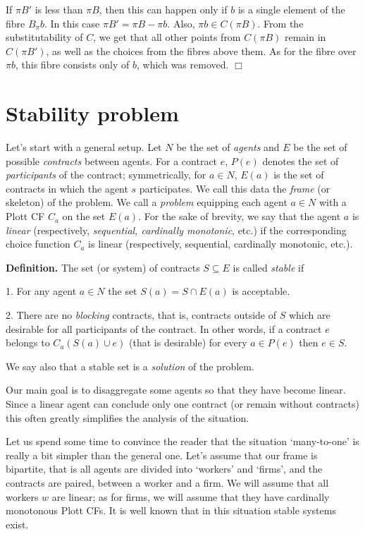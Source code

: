 \documentclass[12pt,a4paper]{article}
\begin{document}
If $\pi B'$ is less than $\pi B$, then this can happen only if $b$ is a single element of the fibre $B_\pi b$. In this case $\pi B'=\pi B-\pi b$. Also, $\pi b\in C(\pi B)$. From the substitutability of $C$, we get that all other points from $C(\pi B)$ remain in $C(\pi B')$, as well as the choices from the fibres above them. As for the fibre over $\pi b$, this fibre consists only of $b$, which was removed. $\Box$\medskip



\section{Stability problem}

Let's start with a general setup. Let $N$ be the set of \emph{agents} and $E$ be the set of possible \emph{contracts} between agents. For a contract $e$, $P(e)$ denotes the set of \emph{participants} of the contract; symmetrically, for $a\in N$, $E(a)$ is the set of contracts in which the agent $s$ participates. We call this data the \emph{frame} (or skeleton) of the problem. We call a \emph{problem} equipping each agent $a\in N$ with a Plott CF $C_a$ on the set $E(a)$. For the sake of brevity, we say that the agent $a$ is \emph{linear} (respectively, \emph{sequential, cardinally monotonic}, etc.) if the corresponding choice function $C_a$ is linear (respectively, sequential, cardinally monotonic, etc.).\medskip

\textbf{Definition.} The set (or system) of contracts $S\subseteq E$ is called \emph{stable} if

1. For any agent $a\in N$ the set $S(a)=S\cap E(a)$ is acceptable.

2. There are no \emph{blocking} contracts, that is, contracts outside of $S$  which are desirable for all participants of the contract. In other words, if a contract $e$ belongs to $C_a(S(a)\cup e)$ (that is desirable) for every $a\in P(e)$ then $e\in S$.\medskip

We say also that a stable set is a \emph{solution} of the problem.

Our main goal is to disaggregate some agents so that they have become linear. Since a linear agent can conclude only one contract (or remain without contracts) this often greatly simplifies the analysis of the situation.

Let us spend some time to convince the reader that the situation `many-to-one' is really a bit simpler than the general one. Let's assume that our frame is bipartite, that is all agents are divided into `workers' and `firms', and the contracts are paired, between a worker and a firm. We will assume that all workers $w$ are linear; as for firms, we will assume that they have cardinally monotonous Plott CFs. It is well known that in this situation stable systems exist.
\end{document}
